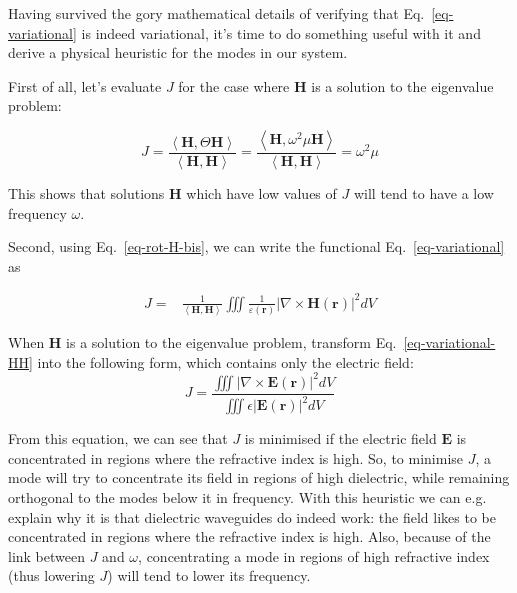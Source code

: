 Having survived the gory mathematical details of verifying that Eq.~\ref{eq-variational} is indeed variational, it's time to do something useful with it and derive a physical heuristic for the modes in our system.

First of all, let's evaluate $J$ for the case where ${\mathbf H}$ is a solution to the eigenvalue problem:

\begin{equation}
J =  \frac{\left\langle {\mathbf H} , \Theta {\mathbf H}\right\rangle}{\left\langle {\mathbf H} , {\mathbf H}\right\rangle} = \frac{\left\langle {\mathbf H} , \omega^2 \mu {\mathbf H}\right\rangle}{\left\langle {\mathbf H} , {\mathbf H}\right\rangle} = \omega^2 \mu
\end{equation}

This shows that solutions ${\mathbf H}$ which have low values of $J$ will tend to have a low frequency $\omega$.

Second, using Eq.~\ref{eq-rot-H-bis}, we can write the functional Eq.~\ref {eq-variational} as

\begin{align}
J =& \frac{1}{\left\langle {\mathbf H} , {\mathbf H}\right\rangle}  \iiint \frac{1}{\varepsilon({\mathbf r})} \left | \nabla \times {\mathbf H({\mathbf r})} \right |^2  dV  \label{eq-variational-HH}
\end{align} 


\begin{exer}
When ${\mathbf H}$ is a solution to the eigenvalue problem, transform Eq.~\ref{eq-variational-HH} into the following form, which contains only the electric field:
$$J=\frac{\iiint \left | \nabla \times {\mathbf E({\mathbf r})} \right |^2  dV} {\iiint \epsilon \left | {\mathbf E({\mathbf r})} \right |^2  dV} $$
\end{exer}


From this equation, we can see that $J$ is minimised if the electric field ${\mathbf E}$ is concentrated in regions where the refractive index is high. So, to minimise $J$, a mode will try to concentrate its field in regions of high dielectric, while remaining orthogonal to the modes below it in frequency. With this heuristic we can e.g. explain why it is that dielectric waveguides do indeed work: the field likes to be concentrated in regions where the refractive index is high. Also, because of the link between $J$ and $\omega$, concentrating a mode in regions of high refractive index (thus lowering $J$) will tend to lower its frequency.

